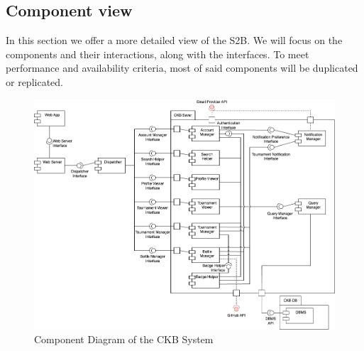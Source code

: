 \vspace{1cm}

\subsection{Component view}
In this section we offer a more detailed view of the S2B. We will focus on the components and their interactions, along with the interfaces. To meet performance and availability criteria, most of said components will be duplicated or replicated.
\begin{figure}[ht]
    \centering
    \includegraphics[width=1\linewidth]{src/Component Diagram of the CKB System.png}
    \caption{Component Diagram of the CKB System}
    \label{fig:Component Diagram of the CKB System}
\end{figure}
\\
\newpage


